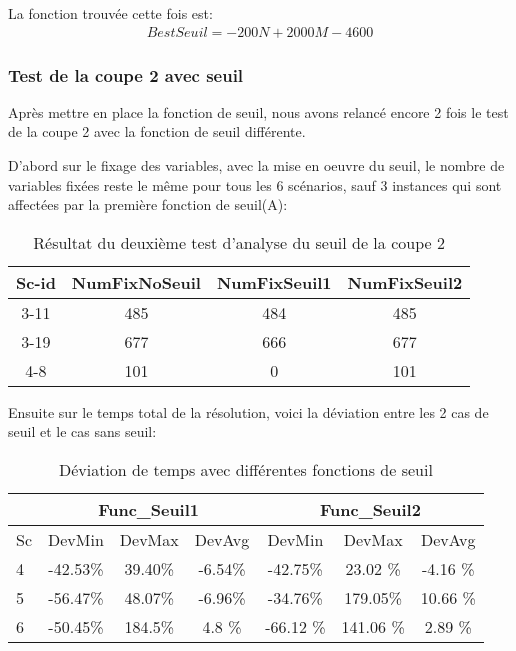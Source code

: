 \documentclass[twoside,fleqn]{EPURapport}
\begin{document}
La fonction trouvée cette fois est:
\begin{align}
BestSeuil=-200N + 2000M-4600 %
\end{align}

\subsubsection{Test de la coupe 2 avec seuil }
Après mettre en place la fonction de seuil, nous avons relancé encore 2 fois le test de la coupe 2 avec la fonction de seuil différente.

D'abord sur le fixage des variables, avec la mise en oeuvre du seuil, le nombre de variables fixées reste le même pour tous les 6 scénarios, sauf 3 instances qui sont affectées par la première fonction de seuil(A):
\clearpage
\begin{table}[h]
    \centering
    \begin{tabular}{|c|c|c|c|}
    	\hline
Sc-id& 	NumFixNoSeuil	& NumFixSeuil1	& NumFixSeuil2\\ \hline
3-11 & 	485	& 484	& 485      \\ \hline
3-19 & 	677	& 666	& 677      \\ \hline
4-8 & 	101	& 0	& 101     \\ \hline
    \end{tabular}
    \label{tab_cut2_seuil_fix_cmp}
    \caption{Résultat du deuxième test d'analyse du seuil de la coupe 2}
\end{table}
\bigskip

Ensuite sur le temps total de la résolution, voici la déviation entre les 2 cas de seuil et le cas sans seuil:
\begin{table}[h]
    \centering
    \begin{tabular}{|l|c|c|c|c|c|c|}
    	\hline
  &\multicolumn{3}{c}{Func\_Seuil1}	&\multicolumn{3}{|c|}{Func\_Seuil2}\\ \hline
Sc  & 	DevMin	& DevMax	& DevAvg& 	DevMin	& DevMax	& DevAvg \\ \hline
4 & 	-42.53\%	& 39.40\%	& -6.54\% & -42.75\% & 23.02 \%& -4.16  \%    \\ \hline
5 & 	-56.47\%	& 48.07\%	& -6.96\% & -34.76\% & 179.05\% & 10.66 \%     \\ \hline
6  & 	-50.45\%	& 184.5\%	& 4.8  \%& -66.12 \%& 141.06 \%& 2.89   \%  \\ \hline
    \end{tabular}
    \label{tab_cut2_seuil_tim_cmp}
    \caption{Déviation de temps avec différentes fonctions de seuil}
\end{table}
\bigskip
\end{document}
